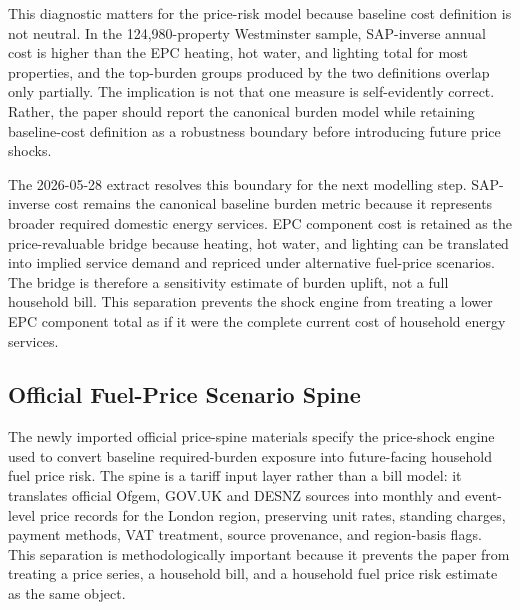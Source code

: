 This diagnostic matters for the price-risk model because baseline cost definition is not neutral. In the 124,980-property Westminster sample, SAP-inverse annual cost is higher than the EPC heating, hot water, and lighting total for most properties, and the top-burden groups produced by the two definitions overlap only partially. The implication is not that one measure is self-evidently correct. Rather, the paper should report the canonical burden model while retaining baseline-cost definition as a robustness boundary before introducing future price shocks.

The 2026-05-28 extract resolves this boundary for the next modelling step. SAP-inverse cost remains the canonical baseline burden metric because it represents broader required domestic energy services. EPC component cost is retained as the price-revaluable bridge because heating, hot water, and lighting can be translated into implied service demand and repriced under alternative fuel-price scenarios. The bridge is therefore a sensitivity estimate of burden uplift, not a full household bill. This separation prevents the shock engine from treating a lower EPC component total as if it were the complete current cost of household energy services.

\subsection{Official Fuel-Price Scenario Spine}

The newly imported official price-spine materials specify the price-shock engine used to convert baseline required-burden exposure into future-facing household fuel price risk. The spine is a tariff input layer rather than a bill model: it translates official Ofgem, GOV.UK and DESNZ sources into monthly and event-level price records for the London region, preserving unit rates, standing charges, payment methods, VAT treatment, source provenance, and region-basis flags. This separation is methodologically important because it prevents the paper from treating a price series, a household bill, and a household fuel price risk estimate as the same object.

